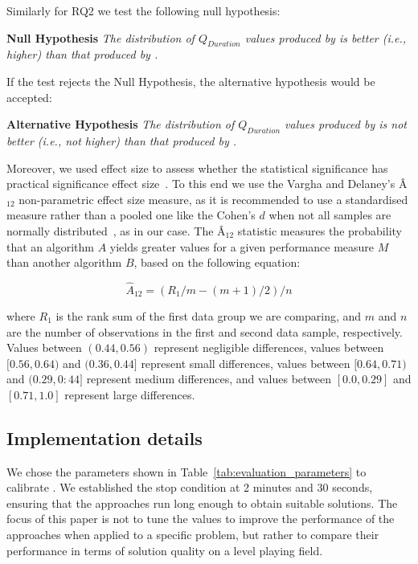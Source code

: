 Similarly for RQ2 we test the following null hypothesis: 

\textbf{Null Hypothesis}
\textit{The distribution of $Q_{Duration}$ values produced by  \simhotep{}  is better (i.e., higher) than that produced by \timhotep{}.}

If the test rejects the Null Hypothesis, the alternative hypothesis would be accepted:

\textbf{Alternative Hypothesis}
\textit{The distribution of $Q_{Duration}$ values produced by \simhotep{}  is not better (i.e., not higher) than that produced by \timhotep{}.}

Moreover, we used effect size to assess whether the statistical significance has practical significance effect size~\cite{Arcuri2014}. To this end we use the Vargha and Delaney's Â$_{12}$ non-parametric effect size measure, as it is recommended to use a standardised measure rather than a pooled one like the Cohen's $d$ when not all samples are normally distributed~\cite{Arcuri2014}, as in our case. 
The Â$_{12}$ statistic measures the probability that an algorithm $A$ yields greater values for a given performance measure $M$ than another algorithm $B$, based on the following equation: 

\begin{equation}
	\hat{A}_{12} = (R_1/m - (m + 1)/2)/n 
\end{equation}

\noindent where $R_1$ is the rank sum of the first data group we are comparing, and $m$ and $n$ are the number of observations in the first and second data sample, respectively. Values between $(0.44, 0.56)$ represent negligible differences, values between $[0.56, 0.64)$ and $(0.36, 0.44]$ represent small differences, values between $[0.64, 0.71)$ and $(0.29, 0:44]$ represent medium differences, and values between $[0.0, 0.29]$ and $[0.71, 1.0]$ represent large differences.

\subsection{Implementation details}
We chose the parameters shown in Table~\ref{tab:evaluation_parameters} to calibrate  \ApproachName{}. We established the stop condition at 2 minutes and 30 seconds, ensuring that the approaches run long enough to obtain suitable solutions. The focus of this paper is not to tune the values to improve the performance of the approaches when applied to a specific problem, but rather to compare their performance in terms of solution quality on a level playing field.

